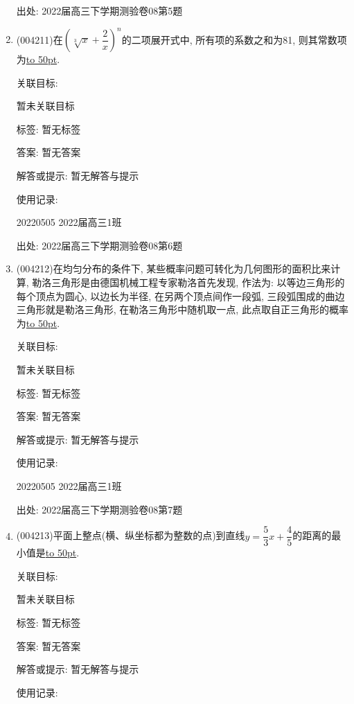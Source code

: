 \documentclass[10pt,a4paper]{article}
\newcommand{\blank}[1]{\underline{\hbox to #1pt{}}}
\begin{document}
\begin{enumerate}[1.]
出处: 2022届高三下学期测验卷08第5题
\item { (004211)}在$(\sqrt[3]x+\dfrac 2x)^n$的二项展开式中, 所有项的系数之和为81, 则其常数项为\blank{50}.


关联目标:

暂未关联目标



标签: 暂无标签

答案: 暂无答案

解答或提示: 暂无解答与提示

使用记录:

20220505	2022届高三1班	


出处: 2022届高三下学期测验卷08第6题
\item { (004212)}在均匀分布的条件下, 某些概率问题可转化为几何图形的面积比来计算, 勒洛三角形是由德国机械工程专家勒洛首先发现, 作法为: 以等边三角形的每个顶点为圆心, 以边长为半径, 在另两个顶点间作一段弧, 三段弧围成的曲边三角形就是勒洛三角形, 在勒洛三角形中随机取一点, 此点取自正三角形的概率为\blank{50}.
\begin{center}
\end{center}


关联目标:

暂未关联目标



标签: 暂无标签

答案: 暂无答案

解答或提示: 暂无解答与提示

使用记录:

20220505	2022届高三1班	


出处: 2022届高三下学期测验卷08第7题
\item { (004213)}平面上整点(横、纵坐标都为整数的点)到直线$y=\dfrac 53x+\dfrac 45$的距离的最小值是\blank{50}.


关联目标:

暂未关联目标



标签: 暂无标签

答案: 暂无答案

解答或提示: 暂无解答与提示

使用记录:


\end{enumerate}
\end{document}
